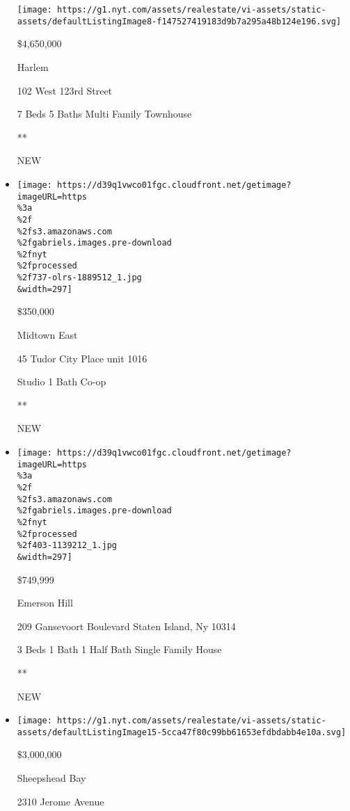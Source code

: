 \begin{itemize}
  \texttt{[image: https://g1.nyt.com/assets/realestate/vi-assets/static-assets/defaultListingImage8-f147527419183d9b7a295a48b124e196.svg]}

  \$4,650,000

  Harlem

  102 West 123rd Street

  7 Beds \textbar{} 5 Baths \textbar{} Multi Family Townhouse

  **

  NEW
\item
  \href{/real-estate/usa/ny/new-york/midtown-east/homes-for-sale/45-tudor-city-place/737-OLRS-1889512?}{}

  \texttt{[image: https://d39q1vwco01fgc.cloudfront.net/getimage?imageURL=https\\\%3a\\\%2f\\\%2fs3.amazonaws.com\\\%2fgabriels.images.pre-download\\\%2fnyt\\\%2fprocessed\\\%2f737-olrs-1889512\_1.jpg\\\&width=297]}

  \$350,000

  Midtown East

  45 Tudor City Place unit 1016

  Studio \textbar{} 1 Bath \textbar{} Co-op

  **

  NEW
\item
  \href{/real-estate/usa/ny/staten-island/emerson-hill/homes-for-sale/209-gansevoort-boulevard-staten-island-ny-10314/403-1139212?}{}

  \texttt{[image: https://d39q1vwco01fgc.cloudfront.net/getimage?imageURL=https\\\%3a\\\%2f\\\%2fs3.amazonaws.com\\\%2fgabriels.images.pre-download\\\%2fnyt\\\%2fprocessed\\\%2f403-1139212\_1.jpg\\\&width=297]}

  \$749,999

  Emerson Hill

  209 Gansevoort Boulevard Staten Island, Ny 10314

  3 Beds \textbar{} 1 Bath \textbar{} 1 Half Bath \textbar{} Single
  Family House

  **

  NEW
\item
  \href{/real-estate/usa/ny/brooklyn/sheepshead-bay/homes-for-sale/2310-jerome-avenue/13063-5538020?}{}

  \texttt{[image: https://g1.nyt.com/assets/realestate/vi-assets/static-assets/defaultListingImage15-5cca47f80c99bb61653efdbdabb4e10a.svg]}

  \$3,000,000

  Sheepshead Bay

  2310 Jerome Avenue


\end{itemize}

